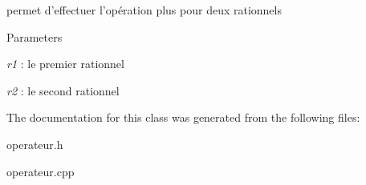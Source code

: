 permet d'effectuer l'opération plus pour deux rationnels 


\begin{DoxyParams}{Parameters}
\item[{\em r1}]: le premier rationnel \item[{\em r2}]: le second rationnel \end{DoxyParams}


The documentation for this class was generated from the following files:\begin{DoxyCompactItemize}
\item 
operateur.h\item 
operateur.cpp\end{DoxyCompactItemize}
